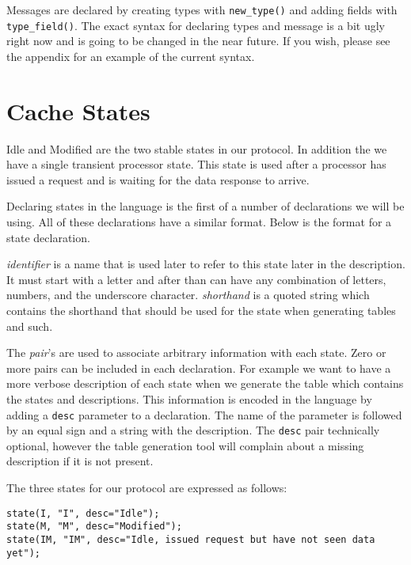 \documentclass[11pt]{article}
\begin{document}
Messages are declared by creating types with {\tt new\_type()} and
adding fields with {\tt type\_field()}.  The exact syntax for
declaring types and message is a bit ugly right now and is going to be
changed in the near future.  If you wish, please see the appendix for
an example of the current syntax.



\section*{Cache States}

Idle and Modified are the two stable states in our protocol.  In
addition the we have a single transient processor state.  This state
is used after a processor has issued a request and is waiting for the
data response to arrive.  

Declaring states in the language is the first of a number of
declarations we will be using.  All of these declarations have a
similar format.  Below is the format for a state declaration.


{\em identifier} is a name that is used later to
refer to this state later in the description.  It must start with a
letter and after than can have any combination of letters, numbers,
and the underscore character.  {\em shorthand} is a quoted string
which contains the shorthand that should be used for the state when
generating tables and such.

The {\em pair}'s are used to associate arbitrary information with each
state.  Zero or more pairs can be included in each declaration.  For
example we want to have a more verbose description of each state when
we generate the table which contains the states and descriptions.
This information is encoded in the language by adding a {\tt desc}
parameter to a declaration.  The name of the parameter is followed by
an equal sign and a string with the description.  The {\tt desc} pair
technically optional, however the table generation tool will complain
about a missing description if it is not present.

The three states for our protocol are expressed as follows:

\begin{verbatim}
state(I, "I", desc="Idle");
state(M, "M", desc="Modified");
state(IM, "IM", desc="Idle, issued request but have not seen data yet");
\end{verbatim}
\end{document}
